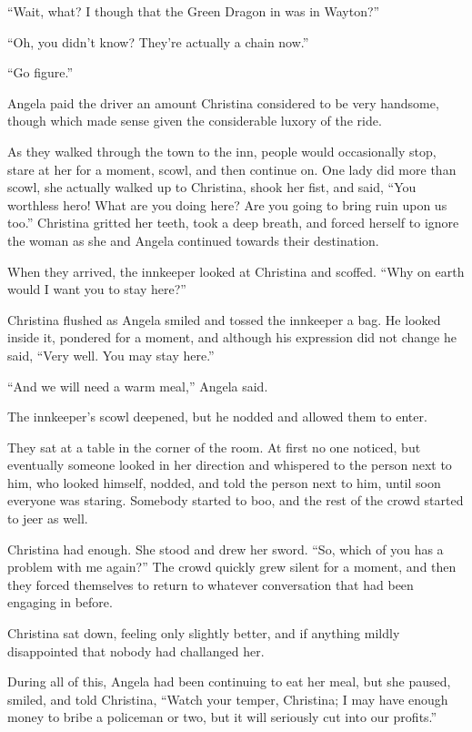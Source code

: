 \documentclass[showtrims,b6paper,draft,10pt]{memoir}
\begin{document}
``Wait, what?  I though that the Green Dragon in was in Wayton?''

``Oh, you didn't know?  They're actually a chain now.''

``Go figure.''

Angela paid the driver an amount Christina considered to be very handsome, though which made sense given the considerable luxory of the ride.

As they walked through the town to the inn, people would occasionally stop, stare at her for a moment, scowl, and then continue on.  One lady did more than scowl, she actually walked up to Christina, shook her fist, and said, ``You worthless hero!  What are you doing here?  Are you going to bring ruin upon us too.''  Christina gritted her teeth, took a deep breath, and forced herself to ignore the woman as she and Angela continued towards their destination.

When they arrived, the innkeeper looked at Christina and scoffed.  ``Why on earth would I want you to stay here?''

Christina flushed as Angela smiled and tossed the innkeeper a bag.  He looked inside it, pondered for a moment, and although his expression did not change he said, ``Very well.  You may stay here.''

``And we will need a warm meal,''  Angela said.

The innkeeper's scowl deepened, but he nodded and allowed them to enter.

They sat at a table in the corner of the room.  At first no one noticed, but eventually someone looked in her direction and whispered to the person next to him, who looked himself, nodded, and told the person next to him, until soon everyone was staring.  Somebody started to boo, and the rest of the crowd started to jeer as well.

Christina had enough.  She stood and drew her sword.  ``So, which of you has a problem with me again?''  The crowd quickly grew silent for a moment, and then they forced themselves to return to whatever conversation that had been engaging in before.

Christina sat down, feeling only slightly better, and if anything mildly disappointed that nobody had challanged her.

During all of this, Angela had been continuing to eat her meal, but she paused, smiled, and told Christina,  ``Watch your temper, Christina;  I may have enough money to bribe a policeman or two, but it will seriously cut into our profits.''
\end{document}
